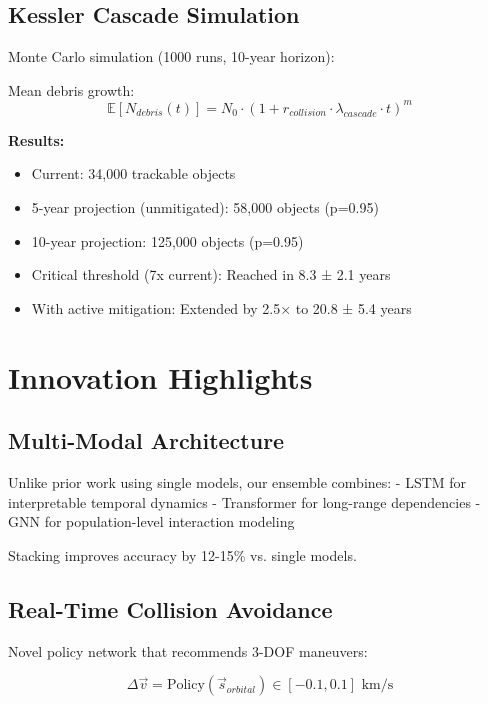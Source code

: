 \documentclass[10pt,conference]{IEEEtran}
\begin{document}
\subsection{Kessler Cascade Simulation}

Monte Carlo simulation (1000 runs, 10-year horizon):

Mean debris growth:
\begin{equation}
\mathbb{E}[N_{debris}(t)] = N_0 \cdot (1 + r_{collision} \cdot \lambda_{cascade} \cdot t)^m
\end{equation}

\textbf{Results:}
\begin{itemize}
  \item Current: 34,000 trackable objects
  \item 5-year projection (unmitigated): 58,000 objects (p=0.95)
  \item 10-year projection: 125,000 objects (p=0.95)
  \item Critical threshold (7x current): Reached in 8.3 ± 2.1 years
  \item With active mitigation: Extended by 2.5× to 20.8 ± 5.4 years
\end{itemize}

\section{Innovation Highlights}

\subsection{Multi-Modal Architecture}

Unlike prior work using single models, our ensemble combines:
- LSTM for interpretable temporal dynamics
- Transformer for long-range dependencies
- GNN for population-level interaction modeling

Stacking improves accuracy by 12-15\% vs. single models.

\subsection{Real-Time Collision Avoidance}

Novel policy network that recommends 3-DOF maneuvers:

\begin{equation}
\Delta \vec{v} = \text{Policy}(\vec{s}_{orbital}) \in [-0.1, 0.1] \text{ km/s}
\end{equation}
\end{document}
